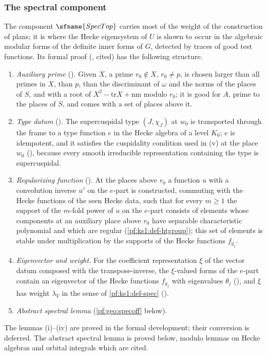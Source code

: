 \subsubsection{The spectral component}\label{sec:pf:geo:spec}

The component $\sfname{SpecTop}$ carries most of the weight of the construction of plans; it is where the Hecke eigensystem of
$U$ is shown to occur in the algebraic modular forms of the definite inner forms of $G$, detected by traces of good test
functions. Its formal proof (, cited) has the following structure.
\begin{enumerate}[label=(\roman*),nosep]
\item \emph{Auxiliary prime} (). Given $X$, a prime $r_0\notin X$, $r_0\ne p$, is chosen
  larger than all primes in $X$, than $p$, than the discriminant of $\omega$ and the norms of the places of $S$, and with a root of
  $X^2-\mathrm{tr}X+\mathrm{nm}$ modulo $r_0$; it is good for $A$, prime to the places of $S$, and comes with a set of places above it.
\item \emph{Type datum} (). The supercuspidal type $(J,\chi_J)$ at $w_0$ is transported through the
  frame to a type function $e$ in the Hecke algebra of a level $K_0$; $e$ is idempotent, and it satisfies the cuspidality condition
  used in (v) at the place $w_0$ (), because every smooth
  irreducible representation containing the type is supercuspidal.
\item \emph{Regularizing function} (). At the places above $r_0$ a function $u$ with a convolution
  inverse $u'$ on the $e$-part is constructed, commuting with the Hecke functions of the seen Hecke data, such that for every $m\ge1$ the
  support of the $m$-fold power of $u$ on the $e$-part consists of elements whose components at an auxiliary place above $r_0$ have
  separable characteristic polynomial and which are regular (\cref{pf:ks1:def-htgroup}); this set of elements is stable under
  multiplication by the supports of the Hecke functions $f_{g_j}$.
\item \emph{Eigenvector and weight.} For the coefficient representation $\xi$ of the vector datum composed with the transpose-inverse,
  the $\xi$-valued forms of the $e$-part contain an eigenvector of the Hecke functions $f_{g_j}$ with eigenvalues $\theta_j$
  (), and $\xi$ has weight $\lambda_V$ in the sense of \cref{pf:ks1:def-spec}
  ().
\item \emph{Abstract spectral lemma} (\cref{pf:geo:specoff} below).
\end{enumerate}
The lemmas (i)--(iv) are proved in the formal development; their conversion is deferred. The abstract spectral lemma is proved
below, modulo lemmas on Hecke algebras and orbital integrals which are cited.

